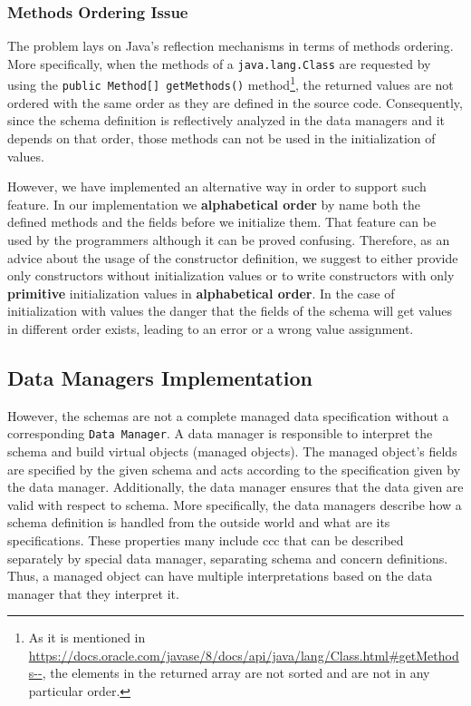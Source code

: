 \subsubsection{Methods Ordering Issue}\label{Methods ordering}
The problem lays on Java's reflection mechanisms in terms of methods ordering.
More specifically, when the methods of a \texttt{java.lang.Class} are requested by using the \texttt{public Method[] getMethods()} method\footnote{
	As it is mentioned in \url{https://docs.oracle.com/javase/8/docs/api/java/lang/Class.html\#getMethods--}, the elements in the returned array are not sorted and are not in any particular order.}, 
the returned values are not ordered with the same order as they are defined in the source code.
Consequently, since the schema definition is reflectively analyzed in the data managers and it depends on that order, those methods can not be used in the initialization of values.

However, we have implemented an alternative way in order to support such feature.
In our implementation we \textbf{alphabetical order} by name both the defined methods and the fields before we initialize them.
That feature can be used by the programmers although it can be proved confusing.
Therefore, as an advice about the usage of the constructor definition, we suggest to either provide only constructors without initialization values or to write constructors with only \textbf{primitive} initialization values in \textbf{alphabetical order}.
In the case of initialization with values the danger that the fields of the schema will get values in different order exists, leading to an error or a wrong value assignment.

\subsection{Data Managers Implementation}\label{Data Managers Implementation}
However, the schemas are not a complete managed data specification without a corresponding \texttt{Data Manager}.
A data manager is responsible to interpret the schema and build virtual objects (managed objects). 
The managed object's fields are specified by the given schema and acts according to the specification given by the data manager.
Additionally, the data manager ensures that the data given are valid with respect to schema.
More specifically, the data managers describe how a schema definition is handled from the outside world and what are its specifications.
These properties many include \ac{ccc} that can be described separately by special data manager, separating schema and concern definitions.
Thus, a managed object can have multiple interpretations based on the data manager that they interpret it.

